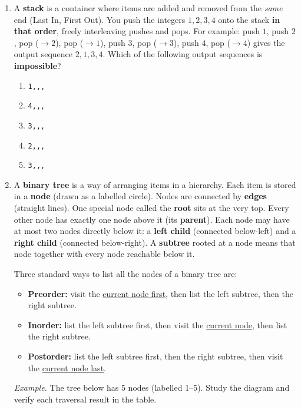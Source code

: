 \documentclass[a4paper,12pt]{article}
\newcommand{\hchoices}[5]{%
  \par\vspace{5pt}%
  \noindent\hspace{2em}%
  \textbf{(A)}~#1\hfill%
  \textbf{(B)}~#2\hfill%
  \textbf{(C)}~#3\hfill%
  \textbf{(D)}~#4\hfill%
  \textbf{(E)}~#5\par%
  \vspace{4pt}%
}
\newenvironment{choices}{%
  \begin{enumerate}[label=\textbf{(\Alph*)},
                    leftmargin=2.5em,
                    itemsep=2pt,
                    topsep=4pt,
                    parsep=0pt]%
}{%
  \end{enumerate}%
}
\begin{document}
\begin{enumerate}[label=\textbf{Q\arabic*.},
                  itemsep=3.5ex,
                  leftmargin=3.8em,
                  parsep=0pt]
\hchoices{9}{10}{11}{12}{7}

\item A \textbf{stack} is a container where items are added and removed
from the \emph{same} end (Last In, First Out). You push the integers
$1, 2, 3, 4$ onto the stack \textbf{in that order}, freely interleaving
pushes and pops. For example: push $1$, push $2$, pop ($\to 2$), pop
($\to 1$), push $3$, pop ($\to 3$), push $4$, pop ($\to 4$) gives the
output sequence $2, 1, 3, 4$. Which of the following output sequences is
\textbf{impossible}?

\begin{choices}
  \item \texttt{1,,,}
  \item \texttt{4,,,}
  \item \texttt{3,,,}
  \item \texttt{2,,,}
  \item \texttt{3,,,}
\end{choices}

\item A \textbf{binary tree} is a way of arranging items in a hierarchy.
Each item is stored in a \textbf{node} (drawn as a labelled circle). Nodes
are connected by \textbf{edges} (straight lines). One special node called the
\textbf{root} sits at the very top. Every other node has exactly one node
above it (its \textbf{parent}). Each node may have at most two nodes directly
below it: a \textbf{left child} (connected below-left) and a
\textbf{right child} (connected below-right). A \textbf{subtree} rooted at a
node means that node together with every node reachable below it.

\smallskip
Three standard ways to list all the nodes of a binary tree are:
\begin{itemize}[nosep, leftmargin=2em, topsep=3pt]
  \item \textbf{Preorder:} visit the \underline{current node first}, then list
        the left subtree, then the right subtree.
  \item \textbf{Inorder:} list the left subtree first, then visit the
        \underline{current node}, then list the right subtree.
  \item \textbf{Postorder:} list the left subtree first, then the right
        subtree, then visit the \underline{current node last}.
\end{itemize}

\medskip
\textit{Example.} The tree below has 5 nodes (labelled 1--5). Study the
diagram and verify each traversal result in the table.


\end{enumerate}
\end{document}
